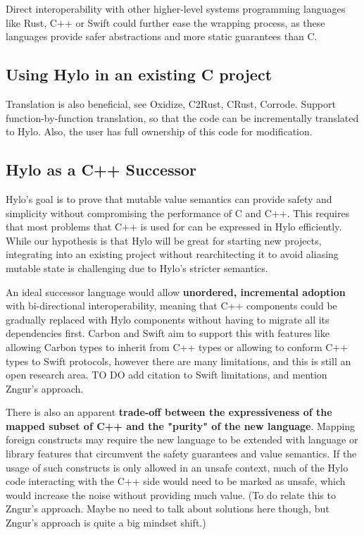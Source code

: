 Direct interoperability with other higher-level systems programming languages like Rust, C++ or Swift could further ease the wrapping process, as these languages provide safer abstractions and more static guarantees than C.
\subsection{Using Hylo in an existing C project}
Translation is also beneficial, see Oxidize, C2Rust, CRust, Corrode. Support function-by-function translation, so that the code can be incrementally translated to Hylo. Also, the user has full ownership of this code for modification.


\subsection{Hylo as a C++ Successor}
Hylo's goal is to prove that mutable value semantics can provide safety and simplicity without compromising the performance of C and C++\cite{hylo-lang}. This requires that most problems that C++ is used for can be expressed in Hylo efficiently. While our hypothesis is that Hylo will be great for starting new projects, integrating into an existing project without rearchitecting it to avoid aliasing mutable state is challenging  due to Hylo's stricter semantics.

An ideal successor language would allow \textbf{unordered, incremental adoption} with bi-directional interoperability\cite{requirements-for-cpp-successor-languages}, meaning that C++ components could be gradually replaced with Hylo components without having to migrate all its dependencies first. Carbon and Swift aim to support this with features like allowing Carbon types to inherit from C++ types\cite{carbon-interop-goals} or allowing to conform C++ types to Swift protocols\cite{swift-cpp-post-hoc-conformance}, however there are many limitations, and this is still an open research area. TO DO add citation to Swift limitations, and mention Zngur's approach.

There is also an apparent \textbf{trade-off between the expressiveness of the mapped subset of C++ and the "purity" of the new language}. Mapping foreign constructs may require the new language to be extended with language or library features that circumvent the safety guarantees and value semantics. If the usage of such constructs is only allowed in an unsafe context, much of the Hylo code interacting with the C++ side would need to be marked as unsafe, which would increase the noise without providing much value. (To do relate this to Zngur's approach. Maybe no need to talk about solutions here though, but Zngur's approach is quite a big mindset shift.)


